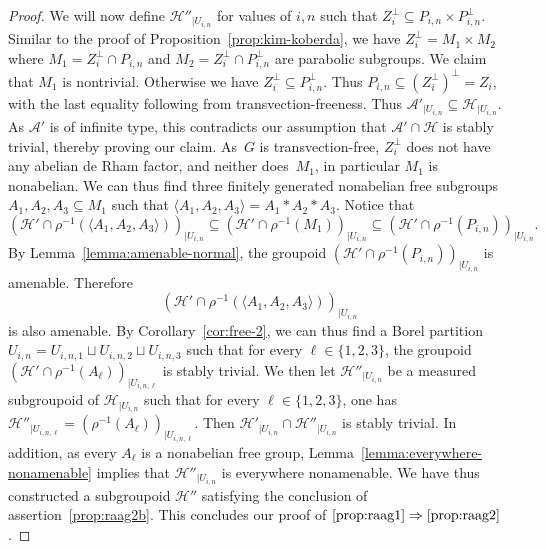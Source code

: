 \documentclass[JEP,XML,SOM,Unicode,NoFloatCountersInSection,published]{cedram}
\let\mathcal\mathscr
\theoremstyle{plain}
\theoremstyle{definition}
\let\dunion\sqcup
\newcommand{\cala}{\mathcal{A}}
\newcommand{\calh}{\mathcal{H}}
\begin{document}
\begin{proof}
We will now define $\calh''_{|U_{i,n}}$ for values of $i,n$ such that $Z^\perp_i\subseteq P_{i,n}\times P^\perp_{i,n}$. Similar to the proof of Proposition~\ref{prop:kim-koberda}, we have $Z^\perp_i= M_1\times M_2$ where $M_1=Z^\perp_i\cap P_{i,n}$ and $M_2=Z^\perp_i\cap P^\perp_{i,n}$ are parabolic subgroups. We claim that $M_1$ is nontrivial. Otherwise we have $Z^\perp_i\!\subseteq\! P^\perp_{i,n}$. Thus $P_{i,n}\!\subseteq\! (Z^\perp_i)^\perp=Z_i$, with the last equality following from transvection-freeness. Thus $\cala'_{|U_{i,n}}\subseteq \calh_{|U_{i,n}}$. As $\cala'$ is of infinite type, this contradicts our assumption that $\cala'\cap \calh$ is stably trivial, thereby proving our claim. As~$G$ is transvection-free, $Z^\perp_i$ does not have any abelian de Rham factor, and neither does~$M_1$, in particular $M_1$ is nonabelian. We can thus find three finitely generated nonabelian free subgroups $A_1,A_2,A_3\subseteq M_1$ such that $\langle A_1,A_2,A_3\rangle=A_1\ast A_2\ast A_3$. Notice that
\[
(\calh'\cap\rho^{-1}(\langle A_1,A_2,A_3\rangle))_{|U_{i,n}}\subseteq (\calh'\cap\rho^{-1}(M_1))_{|U_{i,n}}\subseteq (\calh'\cap\rho^{-1}(P_{i,n}))_{|U_{i,n}}.
\]
By Lemma~\ref{lemma:amenable-normal}, the groupoid $(\calh'\cap \rho^{-1}(P_{i,n}))_{|U_{i,n}}$ is amenable. Therefore
\[
(\calh'\cap\rho^{-1}(\langle A_1,A_2,A_3\rangle))_{|U_{i,n}}
\]
is also amenable. By Corollary~\ref{cor:free-2}, we can thus find a Borel partition $U_{i,n}=U_{i,n,1}\dunion U_{i,n,2}\dunion U_{i,n,3}$ such that for every $\ell\in\{1,2,3\}$, the groupoid $(\calh'\cap\rho^{-1}(A_\ell))_{|U_{i,n,\ell}}$ is stably trivial. We then let $\calh''_{|U_{i,n}}$ be a measured subgroupoid of $\calh_{|U_{i,n}}$ such that for every $\ell\in\{1,2,3\}$, one has $\calh''_{|U_{i,n,\ell}}=(\rho^{-1}(A_\ell))_{|U_{i,n,\ell}}$. Then $\calh'_{|U_{i,n}}\cap\calh''_{|U_{i,n}}$ is stably trivial. In addition, as every $A_\ell$ is a nonabelian free group, Lemma~\ref{lemma:everywhere-nonamenable} implies that $\calh''_{|U_{i,n}}$ is everywhere nonamenable. We have thus constructed a subgroupoid $\calh''$ satisfying the conclusion of assertion~\eqref{prop:raag2b}. This concludes our proof of $\eqref{prop:raag1}\Rightarrow\eqref{prop:raag2}$.


\end{proof}
\end{document}
